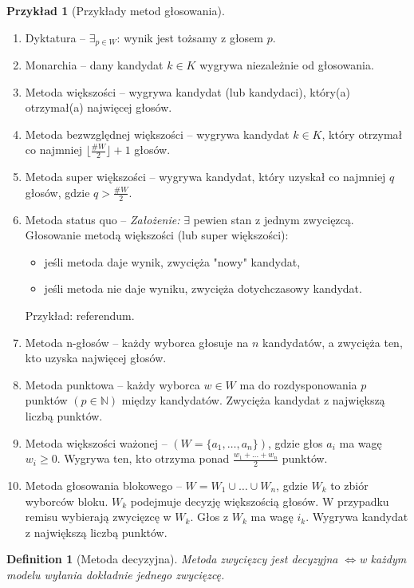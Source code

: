 \documentclass[12pt,a4paper]{article}
\theoremstyle{break}
\newtheorem{definition}{Definition}[section]
\newtheorem{example}{Przykład}[section]
\newcommand{\witw}{$\Leftrightarrow$}
\begin{document}
\begin{example}[Przykłady metod głosowania]
\end{example}
\begin{enumerate}[1)]
	\item Dyktatura – $\exists_{p \in W}$: wynik jest tożsamy z głosem $p$.
	\item Monarchia – dany kandydat $k \in K$ wygrywa niezależnie od głosowania.
	\item Metoda większości – wygrywa kandydat (lub kandydaci), który(a) otrzymał(a) najwięcej głosów.
	\item Metoda bezwzględnej większości – wygrywa kandydat $k \in K$, który otrzymał co najmniej $\lfloor\frac{\# W}{2}\rfloor + 1$ głosów.
	\item Metoda super większości – wygrywa kandydat, który uzyskał co najmniej $q$ głosów, gdzie $q > \frac{\# W}{2}$.
	\item Metoda status quo – \textit{Założenie:} $\exists$ pewien stan z jednym zwycięzcą.
	\\ Głosowanie metodą większości (lub super większości):
	\begin{itemize}
		\item jeśli metoda daje wynik, zwycięża "nowy" kandydat,
		\item jeśli metoda nie daje wyniku, zwycięża dotychczasowy kandydat.
	\end{itemize}
	Przykład: referendum.
	\item Metoda n-głosów – każdy wyborca głosuje na $n$ kandydatów, a zwycięża ten, kto uzyska najwięcej głosów.
	\item Metoda punktowa – każdy wyborca $w \in W$ ma do rozdysponowania $p$ punktów $(p \in \mathbb{N})$ między kandydatów. Zwycięża kandydat z największą liczbą punktów.
	\item Metoda większości ważonej – $(W = \{a_1,\dots,a_n\})$, gdzie głos $a_i$ ma wagę $w_i \geq 0$. Wygrywa ten, kto otrzyma ponad $\frac{w_1 + \dots + w_n}{2}$ punktów.
	\item Metoda głosowania blokowego – $W = W_1 \cup \dots \cup W_n$, gdzie $W_k$ to zbiór wyborców bloku. $W_k$ podejmuje decyzję większością głosów. W przypadku remisu wybierają zwycięzcę w $W_k$. Głos z $W_k$ ma wagę $i_k$. Wygrywa kandydat z największą liczbą punktów.
\end{enumerate}

\begin{definition}[Metoda decyzyjna]
	Metoda zwycięzcy jest decyzyjna \witw w każdym modelu wyłania dokładnie jednego zwycięzcę.
\end{definition}
\end{document}
